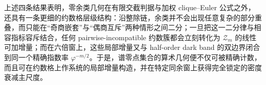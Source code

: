 \noindent
上述四条结果表明，零余类几何在有限交截判据与加权 clique--Euler 公式之外，还具有一条更细的约数格层级结构：沿整除链，余类并不会出现任意复杂的部分重叠，而只能在“奇商嵌套”与“偶商互斥”两种情形之间二分；一旦把这一二分律与相容指标容斥结合，任何 pairwise-incompatible 约数簇都会立刻转化为 \(\mathcal Z_m\) 的线性可加增量；而在六倍窗上，这些局部增量又与 half-order dark band 的双边界闭合到同一个精确指数率 \(\varphi^{-m/2}\)。于是，谱零点集合的算术几何便不仅可被精确计数，而且可在约数格上作系统的局部增量构造，并在特定同余窗上获得完全锁定的密度衰减主尺度。






\endinput

